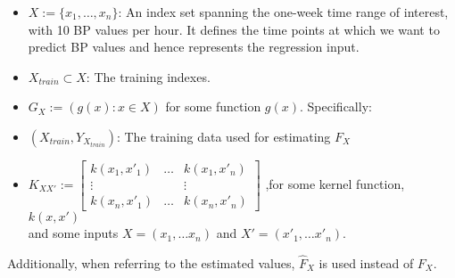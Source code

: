 \begin{itemize}
    \item $X := \{ x_1, \dots, x_n \}$: An index set spanning the one-week time
    range of interest, with 10 BP values per hour. It defines the time points at
    which we want to predict BP values and hence represents the regression input.

    \item $X_{train} \subset X$: The training indexes. \\

    \item $G_X := (g(x) : x \in X )$ for some function $g(x)$.
    Specifically:


    \item $(X_{train}, Y_{X_{train}})$: The training data used for estimating $F_X$



    \item $K_{XX'} := \begin{bmatrix}
            k(x_1, x'_1) & \dots & k(x_1, x'_n)\\
            \vdots  &  & \vdots \\
            k(x_n, x'_1) & \dots  & k(x_n, x'_n)
         \end{bmatrix}$ ,for some kernel function, $k(x, x')$ \\

        and some inputs $X=(x_1, \dots x_n)$ and $X'=(x'_1, \dots x'_n)$.
\end{itemize}

Additionally, when referring to the estimated values,
$\hat{F}_X$ is used instead of $F_X$.


